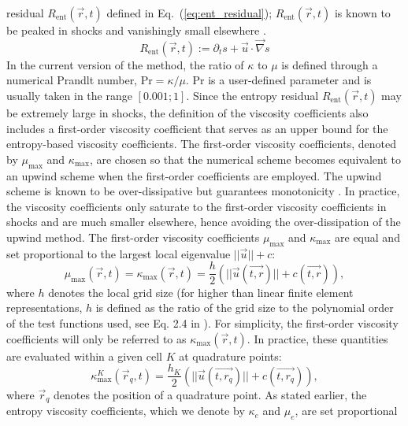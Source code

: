 \documentclass[preprint,10pt]{elsarticle}
\newcommand{\grad}{\vec{\nabla}}
\renewcommand{\Pr}{\textrm{Pr}}
\newcommand{\resi}{R_\text{ent}}
\newcommand{\eqt}[1]{Eq.~(\ref{#1})}                     %
\begin{document}
residual $\resi(\vec{r},t)$ defined in \eqt{eq:ent_residual}; $\resi(\vec{r},t)$ is known to be 
peaked in shocks and vanishingly small elsewhere \cite{Toro}. 
%
\begin{equation}
\label{eq:ent_residual}
\resi(\vec{r}, t) := \partial_t s + \vec{u} \cdot \grad s
\end{equation}
%
In the current version of the method, the ratio of $\kappa$ to $\mu$ is defined through a numerical 
Prandlt number, $\Pr = \kappa / \mu$.  $\Pr$ is a user-defined parameter and is usually taken in the 
range $[ 0.001; 1 ]$. Since the entropy residual $\resi(\vec{r},t)$ may be extremely large in shocks, 
the definition of the viscosity coefficients also includes a first-order viscosity coefficient that 
serves as an upper bound for the entropy-based viscosity coefficients. The first-order viscosity 
coefficients, denoted by $\mu_{\max}$ and $\kappa_{\max}$, are chosen so that the numerical scheme 
becomes equivalent to an upwind scheme when the first-order coefficients are employed. The upwind 
scheme is known to be over-dissipative but guarantees monotonicity \cite{Toro}. In practice, the 
viscosity coefficients only saturate to the first-order viscosity coefficients in shocks and are 
much smaller elsewhere, hence avoiding the over-dissipation of the upwind method.  The first-order 
viscosity coefficients $\mu_{\max}$ and $\kappa_{\max}$ are equal and set proportional to the 
largest local eigenvalue $|| \vec{u} || + c $:
%
\begin{equation}
\label{eq:fo}
\mu_{\max}(\vec{r}, t) = \kappa_{\max}(\vec{r}, t) = \frac{h}{2} \left( || \vec{u}(\vec{t,r}) || + c(\vec{t,r}) \right),
\end{equation}
%
where $h$ denotes the local grid size (for higher than linear finite element representations, $h$ is defined 
as the ratio of the grid size to the polynomial order of the test functions used, see Eq. 2.4 in \cite{valentin}). 
For simplicity, the first-order viscosity coefficients will only be referred to as $\kappa_{\max}(\vec{r}, t)$. 
In practice, these quantities are evaluated within a given cell $K$ at quadrature points:
%
\begin{equation}
\label{eq:fo_quad}
\kappa^K_{\max}(\vec{r}_q, t) = \frac{h_K}{2} \left( || \vec{u}(\vec{t,r_q}) || + c(\vec{t,r_q}) \right),
\end{equation}
%
where $\vec{r}_q$ denotes the position of a quadrature point.
As stated earlier, the entropy viscosity coefficients, which we denote by $\kappa_e$ and $\mu_e$, are set proportional 
\end{document}
